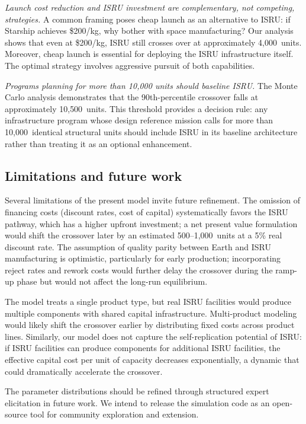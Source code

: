 \documentclass[preprint,12pt]{elsarticle}
\begin{document}
\emph{Launch cost reduction and ISRU investment are complementary, not competing, strategies.} A common framing poses cheap launch as an alternative to ISRU: if Starship achieves \$200/kg, why bother with space manufacturing? Our analysis shows that even at \$200/kg, ISRU still crosses over at approximately 4{,}000~units. Moreover, cheap launch is essential for deploying the ISRU infrastructure itself. The optimal strategy involves aggressive pursuit of both capabilities.

\emph{Programs planning for more than 10{,}000 units should baseline ISRU.} The Monte Carlo analysis demonstrates that the 90th-percentile crossover falls at approximately 10{,}500~units. This threshold provides a decision rule: any infrastructure program whose design reference mission calls for more than 10{,}000~identical structural units should include ISRU in its baseline architecture rather than treating it as an optional enhancement.

\subsection{Limitations and future work}

Several limitations of the present model invite future refinement. The omission of financing costs (discount rates, cost of capital) systematically favors the ISRU pathway, which has a higher upfront investment; a net present value formulation would shift the crossover later by an estimated 500--1{,}000~units at a 5\% real discount rate. The assumption of quality parity between Earth and ISRU manufacturing is optimistic, particularly for early production; incorporating reject rates and rework costs would further delay the crossover during the ramp-up phase but would not affect the long-run equilibrium.

The model treats a single product type, but real ISRU facilities would produce multiple components with shared capital infrastructure. Multi-product modeling would likely shift the crossover earlier by distributing fixed costs across product lines. Similarly, our model does not capture the self-replication potential of ISRU: if ISRU facilities can produce components for additional ISRU facilities, the effective capital cost per unit of capacity decreases exponentially, a dynamic that could dramatically accelerate the crossover.

The parameter distributions should be refined through structured expert elicitation in future work. We intend to release the simulation code as an open-source tool for community exploration and extension.
\end{document}
